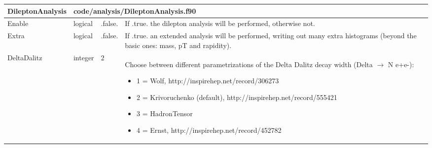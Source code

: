 \documentclass{article}
\begin{document}
\begin{longtable}{llll}
\toprule
\textbf{\large{DileptonAnalysis}} & \multicolumn{3}{l}{\footnotesize{code/analysis/DileptonAnalysis.f90}}\\*
\midrule
\endfirsthead
\midrule
\endhead
Enable & \begin{minipage}[t]{2cm}logical\end{minipage} & \begin{minipage}[t]{2cm}.false.\end{minipage} & \begin{minipage}[t]{12cm}If .true. the dilepton analysis will be performed, otherwise not.\end{minipage}\\*
\midrule
Extra & \begin{minipage}[t]{2cm}logical\end{minipage} & \begin{minipage}[t]{2cm}.false.\end{minipage} & \begin{minipage}[t]{12cm}If .true. an extended analysis will be performed, writing out many extra histograms (beyond the basic ones: mass, pT and rapidity).\end{minipage}\\*
\midrule
DeltaDalitz & \begin{minipage}[t]{2cm}integer\end{minipage} & \begin{minipage}[t]{2cm}2\end{minipage} & \begin{minipage}[t]{12cm}Choose between different parametrizations of the Delta Dalitz decay width (Delta $\rightarrow$ N e+e-):\begin{itemize}\leftmargin0em\itemindent0pt\item 1 = Wolf, http://inspirehep.net/record/306273\item 2 = Krivoruchenko (default), http://inspirehep.net/record/555421\item 3 = HadronTensor\item 4 = Ernst, http://inspirehep.net/record/452782\end{itemize}\end{minipage}\\*
\midrule

\end{longtable}
\end{document}

